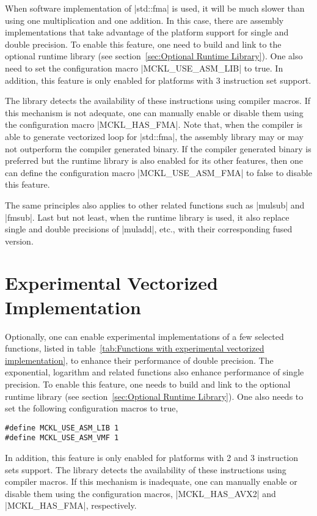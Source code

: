 When software implementation of |std::fma| is used, it will be much slower than
using one multiplication and one addition. In this case, there are assembly
implementations that take advantage of the platform support for single and
double precision. To enable this feature, one need to build and link to the
optional runtime library (see section~\ref{sec:Optional Runtime Library}). One
also need to set the configuration macro |MCKL_USE_ASM_LIB| to true. In
addition, this feature is only enabled for platforms with \fma{}3 instruction
set support.

The library detects the availability of these instructions using compiler
macros. If this mechanism is not adequate, one can manually enable or disable
them using the configuration macro |MCKL_HAS_FMA|. Note that, when the compiler
is able to generate vectorized loop for |std::fma|, the assembly library may or
may not outperform the compiler generated binary. If the compiler generated
binary is preferred but the runtime library is also enabled for its other
features, then one can define the configuration macro |MCKL_USE_ASM_FMA| to
false to disable this feature.

The same principles also applies to other related functions such as |mulsub|
and |fmsub|. Last but not least, when the runtime library is used, it also
replace single and double precisions of |muladd|, etc., with their
corresponding fused version.

\section{Experimental Vectorized Implementation}
\label{sec:Experimental Vectorized Implementation}

Optionally, one can enable experimental implementations of a few selected
functions, listed in table~\ref{tab:Functions with experimental vectorized
implementation}, to enhance their performance of double precision. The
exponential, logarithm and related functions also enhance performance of single
precision. To enable this feature, one needs to build and link to the optional
runtime library (see section~\ref{sec:Optional Runtime Library}). One also
needs to set the following configuration macros to true,
\begin{verbatim}
#define MCKL_USE_ASM_LIB 1
#define MCKL_USE_ASM_VMF 1
\end{verbatim}
In addition, this feature is only enabled for platforms with \avx{}2 and
\fma{}3 instruction sets support. The library detects the availability of these
instructions using compiler macros. If this mechanism is inadequate, one can
manually enable or disable them using the configuration macros, |MCKL_HAS_AVX2|
and |MCKL_HAS_FMA|, respectively.

